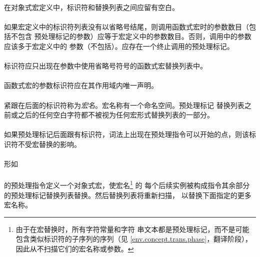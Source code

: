 \paragraph{}
在对象式宏定义中，标识符和替换列表之间应留有空白。

\paragraph{}
如果宏定义中的标识符列表没有以省略号结尾，则调用函数式宏时的参数数目（包括不包含
预处理标记的参数）应等于宏定义中的参数数目。否则，调用中的参数应该多于宏定义中的
参数（不包括）。应存在一个\tm{)}终止调用的预处理标记。

\paragraph{}
标识符应只出现在参数中使用省略号符号的函数式宏替换列表中。

\paragraph{}
函数式宏的参数标识符应在其作用域内唯一声明。

\semantic
\paragraph{}
紧跟在后面的标识符称为\textit{宏名}。宏名称有一个命名空间。预处理标记
替换列表之前或之后的任何空白字符都不被视为任何宏形式替换列表的一部分。

\paragraph{}
如果预处理标记\tm{\#}后面跟有标识符，词法上出现在预处理指令可以开始的点，则该标
识符不受宏替换的影响。

\paragraph{}
形如                                                                          \\
\mbox{\hspace{4em} }   \\
的预处理指令定义一个对象式宏，使宏名\footnote{由于在宏替换时，所有字符常量和字符
串文本都是预处理标记，而不是可能包含类似标识符的子序列的序列（见
\ref{env.concept.trans.phase}，翻译阶段），因此从不扫描它们的宏名称或参数。} 的
每个后续实例被构成指令其余部分的预处理标记替换列表替换。然后替换列表将重新扫描，
以替换下面指定的更多宏名称。

